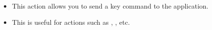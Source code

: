 \begin{itemize}
\item This action allows you to send a key command to the application. 
\item This is useful for actions such as , , etc.
\end{itemize}

